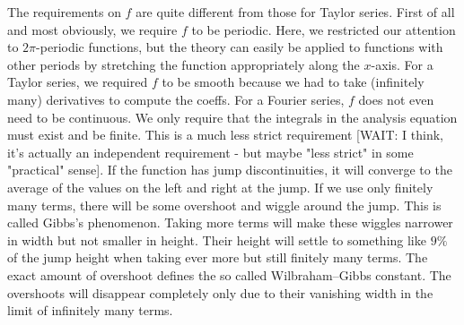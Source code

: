 \medskip
The requirements on $f$ are quite different from those for Taylor series. First of all and most obviously, we require $f$ to be periodic. Here, we restricted our attention to $2 \pi$-periodic functions, but the theory can easily be applied to functions with other periods by stretching the function appropriately along the $x$-axis.  For a Taylor series, we required $f$ to be smooth because we had to take (infinitely many) derivatives to compute the coeffs. For a Fourier series, $f$ does not even need to be continuous. We only require that the integrals in the analysis equation must exist and be finite. This is a much less strict requirement [WAIT: I think, it's actually an independent requirement - but maybe "less strict" in some "practical" sense]. If the function has jump discontinuities, it will converge to the average of the values on the left and right at the jump. If we use only finitely many terms, there will be some overshoot and wiggle around the jump. This is called Gibbs's phenomenon. Taking more terms will make these wiggles narrower in width but not smaller in height. Their height will settle to something like $9\%$ of the jump height when taking ever more but still finitely many terms. The exact amount of overshoot defines the so called Wilbraham–Gibbs constant. The overshoots will disappear completely only due to their vanishing width in the limit of infinitely many terms.




